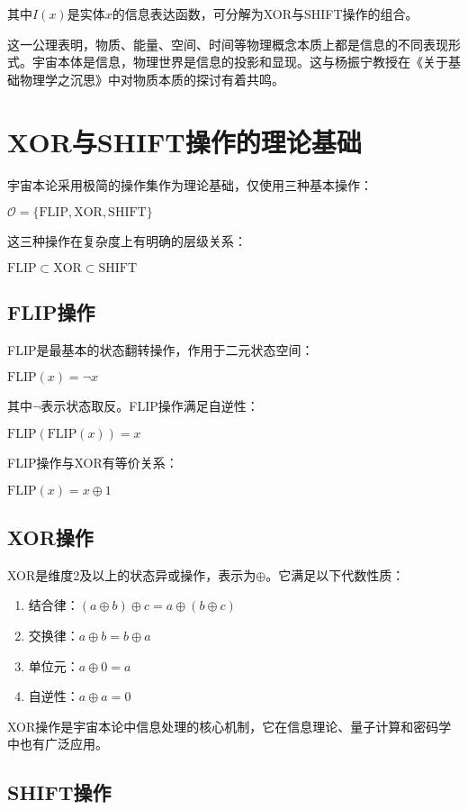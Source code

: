 其中$I(x)$是实体$x$的信息表达函数，可分解为XOR与SHIFT操作的组合。

这一公理表明，物质、能量、空间、时间等物理概念本质上都是信息的不同表现形式。宇宙本体是信息，物理世界是信息的投影和显现。这与杨振宁教授在《关于基础物理学之沉思》中对物质本质的探讨有着共鸣。

\section{XOR与SHIFT操作的理论基础}

宇宙本论采用极简的操作集作为理论基础，仅使用三种基本操作：

$\mathcal{O} = \{\text{FLIP}, \text{XOR}, \text{SHIFT}\}$

这三种操作在复杂度上有明确的层级关系：

$\text{FLIP} \subset \text{XOR} \subset \text{SHIFT}$

\subsection{FLIP操作}

FLIP是最基本的状态翻转操作，作用于二元状态空间：

$\text{FLIP}(x) = \neg x$

其中$\neg$表示状态取反。FLIP操作满足自逆性：

$\text{FLIP}(\text{FLIP}(x)) = x$

FLIP操作与XOR有等价关系：

$\text{FLIP}(x) = x \oplus 1$

\subsection{XOR操作}

XOR是维度2及以上的状态异或操作，表示为$\oplus$。它满足以下代数性质：

\begin{enumerate}
  \item 结合律：$(a \oplus b) \oplus c = a \oplus (b \oplus c)$
  \item 交换律：$a \oplus b = b \oplus a$
  \item 单位元：$a \oplus 0 = a$
  \item 自逆性：$a \oplus a = 0$
\end{enumerate}

XOR操作是宇宙本论中信息处理的核心机制，它在信息理论、量子计算和密码学中也有广泛应用。

\subsection{SHIFT操作}

